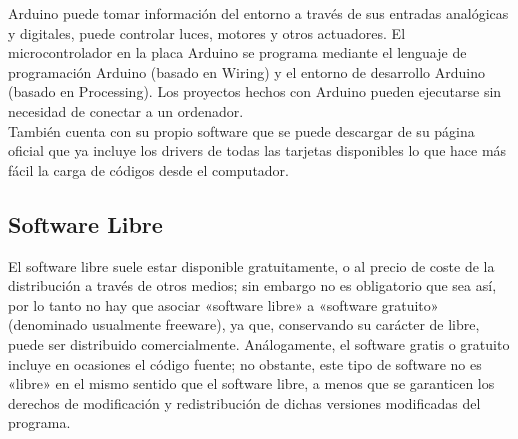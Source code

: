 \documentclass[]{article}
\begin{document}

Arduino puede tomar información del entorno a través de sus entradas analógicas y digitales, puede controlar luces, motores y otros actuadores. El microcontrolador en la placa Arduino se programa mediante el lenguaje de programación Arduino (basado en Wiring) y el entorno de desarrollo Arduino (basado en Processing). Los proyectos hechos con Arduino pueden ejecutarse sin necesidad de conectar a un ordenador.\cite{Ard}\\

También cuenta con su propio software que se puede descargar de su página oficial que ya incluye los drivers de todas las tarjetas disponibles lo que hace más fácil la carga de códigos desde el computador.\cite{Ard}\\



\subsection{Software Libre}

El software libre suele estar disponible gratuitamente, o al precio de coste de la distribución a través de otros medios; sin embargo no es obligatorio que sea así, por lo tanto no hay que asociar «software libre» a «software gratuito» (denominado usualmente freeware), ya que, conservando su carácter de libre, puede ser distribuido comercialmente. Análogamente, el software gratis o gratuito incluye en ocasiones el código fuente; no obstante, este tipo de software no es «libre» en el mismo sentido que el software libre, a menos que se garanticen los derechos de modificación y redistribución de dichas versiones modificadas del programa.\cite{SL}\\
\end{document}
